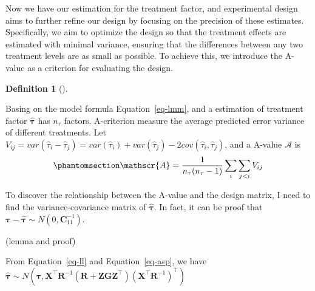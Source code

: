 \documentclass[
  a4paper,
  oneside,
  openany,
  12pt,
  onecolumn]{book}
\theoremstyle{plain}
\theoremstyle{definition}
\newtheorem{definition}{Definition}[chapter]
\theoremstyle{remark}
\begin{document}
Now we have our estimation for the treatment factor, and experimental
design aims to further refine our design by focusing on the precision of
these estimates. Specifically, we aim to optimize the design so that the
treatment effects are estimated with minimal variance, ensuring that the
differences between any two treatment levels are as small as possible.
To achieve this, we introduce the A-value as a criterion for evaluating
the design.

\begin{definition}[]\protect\hypertarget{def-A-value}{}\label{def-A-value}

Basing on the model formula Equation~\ref{eq-lmm}, and a estimation of
treatment factor \(\hat{\boldsymbol{\tau}}\) has \(n_{\tau}\) factors.
A-criterion measure the average predicted error variance of different
treatments. Let
\(V_{ij}= var(\hat{\tau}_i-\hat{\tau}_j)=var(\hat{\tau}_i)+var(\hat{\tau}_j)-2cov(\hat{\tau}_i,\hat{\tau}_j)\),
and a A-value \(\mathscr{A}\) is
\begin{equation}\phantomsection\label{eq-a}{
\mathscr{A}=\frac{1}{n_{\tau}(n_{\tau}-1)}\sum_{i}\sum_{j<i}V_{ij}
}\end{equation}

\end{definition}

To discover the relationship between the A-value and the design matrix,
I need to find the variance-covariance matrix of
\(\hat{\boldsymbol{\tau}}\). In fact, it can be proof that
\(\boldsymbol{\tau}-\hat{\boldsymbol{\tau}}\sim N(0,\boldsymbol{C}_{11}^{-1})\).

(lemma and proof)

From Equation~\ref{eq-ll} and Equation~\ref{eq-asp}, we have
\(\hat{\boldsymbol{\tau}}\sim N(\boldsymbol{\tau},\boldsymbol{X}^\top\boldsymbol{R}^{-1}(\boldsymbol{R}+\boldsymbol{ZGZ}^\top)(\boldsymbol{X}^\top\boldsymbol{R}^{-1})^\top)\)
\end{document}

